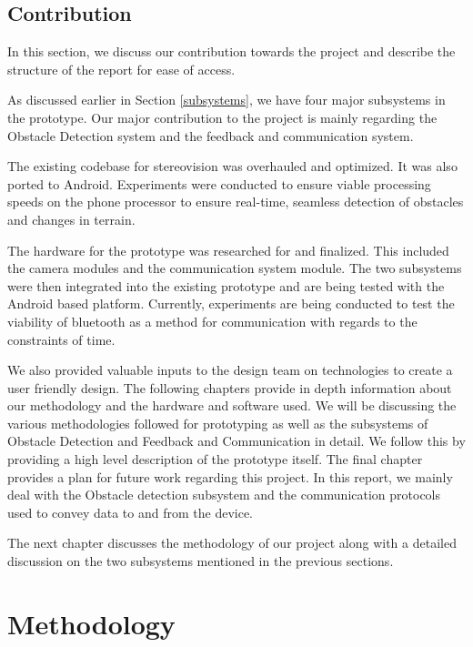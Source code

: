 \documentclass[11pt]{report}
\begin{document}
{\section{Contribution}

In this section, we discuss our contribution towards the project and describe the structure of the report for ease of access.  

As discussed earlier in Section \ref{subsystems}, we have four major subsystems in the prototype. Our major contribution to the project is mainly regarding the Obstacle Detection system and the feedback and communication system. 

The existing codebase for stereovision was overhauled and optimized. It was also ported to Android. Experiments were conducted to ensure viable processing speeds on the phone processor to ensure real-time, seamless detection of obstacles and changes in terrain. 

The hardware for the prototype was researched for and finalized. This included the camera modules and the communication system module. The two subsystems were then integrated into the existing prototype and are being tested with the Android based platform. Currently, experiments are being conducted to test the viability of bluetooth as a method for communication with regards to the constraints of time. 

We also provided valuable inputs to the design team on technologies to create a user friendly design. 
\newline
\newline
The following chapters provide in depth information about our methodology and the hardware and software used. We will be discussing the various methodologies followed for prototyping as well as the subsystems of Obstacle Detection and Feedback and Communication in detail. We follow this by providing a high level description of the prototype itself. The final chapter provides a plan for future work regarding this project. In this report, we mainly deal with the Obstacle detection subsystem and the communication protocols used to convey data to and from the device.

The next chapter discusses the methodology of our project along with a detailed discussion on the two subsystems mentioned in the previous sections.

\chapter{Methodology}

}
\end{document}
